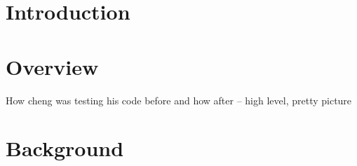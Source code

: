 \documentclass{sig-alternate}
\newcommand{\psharp}{P\#\xspace}
\newcommand{\csharp}{C\#\xspace}
\begin{document}
\maketitle
\begin{abstract}
Testing distributed systems is very challenging due to multiple sources of nondeterminism, such as arbitrary interleavings between event handlers and unexpected node failures. Stress testing, commonly used in industry today, is unable to deal with this kind of nondeterminism, which results in the most tricky bugs being missed during testing and only getting exposed in production.

We present a new methodology for systematically testing unmodified distributed systems. Our approach involves the use of \psharp, an extension of \csharp that combines a flexible environmental modeling approach with a concurrency testing framework, which can capture and systematically explore all sources of nondeterminism. We present two case studies of using \psharp to test production distributed systems inside Microsoft. Using \psharp, we managed to uncover a very subtle bug that was haunting developers for a long time, as they did not have an effective way to reproduce it. \psharp uncovered the bug in a very small setting, which made it easy to examine traces, identify and fix the problem.

\end{abstract}



\section{Introduction}
\label{sec:intro}



\section{Overview}
\label{sec:overview}

How cheng was testing his code before and how after -- high level, pretty picture

%

\section{Background}
\label{sec:bg}
\end{document}

